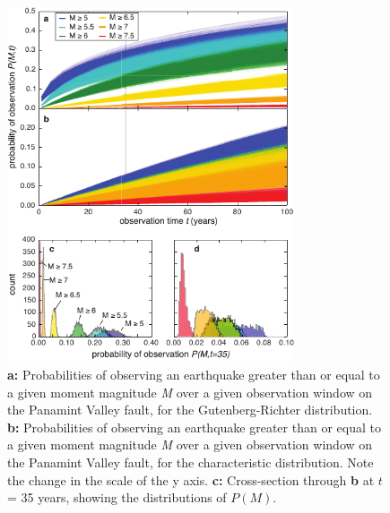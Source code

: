 \documentclass[draft,grl]{AGUTeX}
\begin{document}
\begin{article}
\begin{figure}[bh]
 \noindent\includegraphics[width=20pc]{./figures/pv_probs.pdf}
 \caption{\textbf{a:} Probabilities of observing an earthquake greater than or
 equal to a given moment magnitude \emph{M} over a given observation window 
 on the Panamint Valley fault, for the Gutenberg-Richter distribution. 
 \textbf{b:} Probabilities of observing an earthquake greater than or equal to
 a given moment magnitude \emph{M} over a given observation window on the
 Panamint Valley fault, for the characteristic distribution.  Note the change
 in the scale of the y axis.
 \textbf{c:} Cross-section through \textbf{b} at $t$ = 35 years, showing the
 distributions of $P(M)$.}
 \label{fig:pv}
\end{figure}


\end{article}
\end{document}
